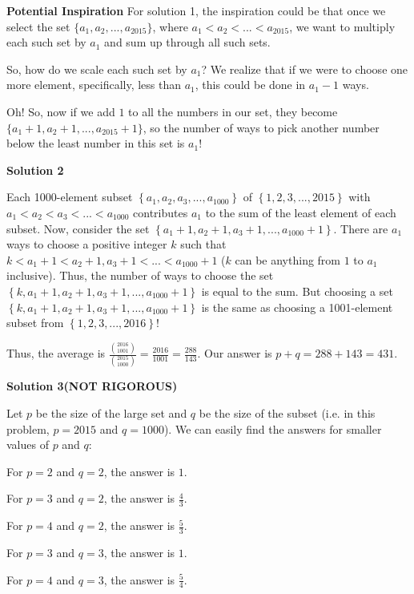 \begin{enumerate}
 \textbf{Potential Inspiration} For solution 1, the inspiration could be that once we select the set $\{a_1, a_2,...,a_{2015}\}$, where $a_1<a_2<...<a_{2015}$, we want to multiply each such set by $a_1$ and sum up through all such sets.

 So, how do we scale each such set by $a_1$? We realize that if we were to choose one more element, specifically, less than $a_1$, this could be done in $a_1-1$ ways.

 Oh! So, now if we add $1$ to all the numbers in our set, they become $\{a_1+1, a_2+1,...,a_{2015}+1\}$, so the number of ways to pick another number below the least number in this set is $a_1$!

 



\textbf{Solution 2}

Each 1000-element subset $\left\{ a_1, a_2,a_3,...,a_{1000}\right\}$ of $\left\{1,2,3,...,2015\right\}$ with $a_1<a_2<a_3<...<a_{1000}$ contributes $a_1$ to the sum of the least element of each subset. Now, consider the set $\left\{a_1+1,a_2+1,a_3+1,...,a_{1000}+1\right\}$. There are $a_1$ ways to choose a positive integer $k$ such that $k<a_1+1<a_2+1,a_3+1<...<a_{1000}+1$ ($k$ can be anything from $1$ to $a_1$ inclusive). Thus, the number of ways to choose the set $\left\{k,a_1+1,a_2+1,a_3+1,...,a_{1000}+1\right\}$ is equal to the sum. But choosing a set $\left\{k,a_1+1,a_2+1,a_3+1,...,a_{1000}+1\right\}$ is the same as choosing a 1001-element subset from $\left\{1,2,3,...,2016\right\}$! 

 Thus, the average is $\frac{\binom{2016}{1001}}{\binom{2015}{1000}}=\frac{2016}{1001}=\frac{288}{143}$. Our answer is $p+q=288+143=\boxed{431}$.

 



\textbf{Solution 3(NOT RIGOROUS)}

Let $p$ be the size of the large set and $q$ be the size of the subset (i.e. in this problem, $p = 2015$ and $q = 1000$). We can easily find the answers for smaller values of $p$ and $q$:

 For $p = 2$ and $q = 2$, the answer is $1$.

 For $p = 3$ and $q = 2$, the answer is $\frac43$.

 For $p = 4$ and $q = 2$, the answer is $\frac53$.

 For $p = 3$ and $q = 3$, the answer is $1$.

 For $p = 4$ and $q = 3$, the answer is $\frac54$.


\end{enumerate}
